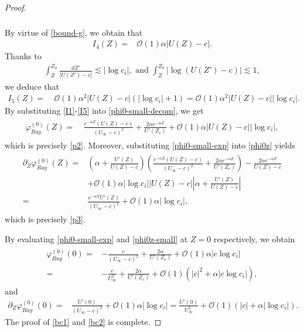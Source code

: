 \documentclass[reqno,11pt]{amsart}
\numberwithin{equation}{section}
\numberwithin{equation}{section}
\theoremstyle{plain}
\begin{document}
\begin{proof}
\begin{align}
\begin{aligned}
	\end{aligned}\end{align}
	By virtue of \eqref{bound-g}, we obtain that
	\begin{align}\label{I4}
		I_4(Z) =& \mathcal{O}(1)\alpha|U(Z)-c|.
	\end{align}
Thanks to
	\begin{align}
		\int_{Z}^{Z_0}\frac{dZ'}{|U(Z')-c|} \lesssim |\log c_i|,\text{ and } 
		\int_{Z}^{Z_0}|\log(U(Z')-c)|\lesssim 1,\nonumber
	\end{align}
we deduce that
	\begin{align}\label{I5}
		I_5(Z)=~&\mathcal{O}(1)\alpha^2 |U(Z)-c|(|\log c_i|+1)=\mathcal{O}(1)\alpha^2 |U(Z)-c||\log c_i|.
	\end{align}
By substituting \eqref{I1}-\eqref{I5} into \eqref{phi0-small-decom}, we get
	\begin{align}\label{phi0-small-exp}
		\begin{aligned}
			\varphi_{Ray}^{(0)}(Z)
			=~&\frac{e^{-\alpha Z}(U(Z)-c)}{ (U_\infty-c)^2}+\frac{2\alpha e^{-\alpha Z}}{U'(Z_c)}+\mathcal{O}(1)\alpha|U(Z)-c||\log c_i|,
	\end{aligned}\end{align}
	which is precisely \eqref{p2}. Moreover, substituting \eqref{phi0-small-exp} into \eqref{phi0z} yields
	\begin{align}\label{phi0z-small}
		\begin{aligned}
			\partial_Z\varphi_{Ray}^{(0)}(Z)=&  \left(\alpha+\frac{U'(Z)}{U(Z)-c}\right)\left(\frac{e^{-\alpha Z}(U(Z)-c)}{ (U_\infty-c)^2}+\frac{2\alpha e^{-\alpha Z}}{U'(Z_c)}\right)-\frac{2\alpha e^{-\alpha Z}}{U(Z)-c}\\
			&+\mathcal{O}(1)\alpha|\log c_i||U(Z)-c|\left|\alpha+\frac{U'(Z)}{U(Z)-c}\right|\\
			=& \frac{e^{-\alpha Z}U'(Z)}{(U_\infty-c)^2}+\mathcal{O}(1)\alpha|\log c_i|,
		\end{aligned}
	\end{align}
	which is precisely \eqref{p3}.
	
	
	By evaluating \eqref{phi0-small-exp} and \eqref{phi0z-small} at $Z=0$ respectively, we obtain
	\begin{align}\label{phi0-0-exp}\begin{aligned}
			\varphi_{Ray}^{(0)}(0) =& -\frac{c}{(U_\infty-c)^2}+\frac{2\alpha}{U'(Z_c)}
			+\mathcal{O}(1)\alpha|c\log c_i|\\
			=&-\frac{c}{U_\infty^2}+\frac{2\alpha}{U'(Z_c)}
			+\mathcal{O}(1)(|c|^2+\alpha|c\log c_i|), 
	\end{aligned}\end{align}
	and \begin{align*}
		\partial_Z\varphi_{Ray}^{(0)}(0)= & \frac{U'(0)}{(U_\infty-c)^2}+\mathcal{O}(1)\alpha|\log c_i|=\frac{U'(0)}{U_\infty^2}+\mathcal{O}(1)(|c|+\alpha|\log c_i|).
	\end{align*}
	The proof of \eqref{bc1} and \eqref{bc2} is complete.
	

\end{proof}
\end{document}

